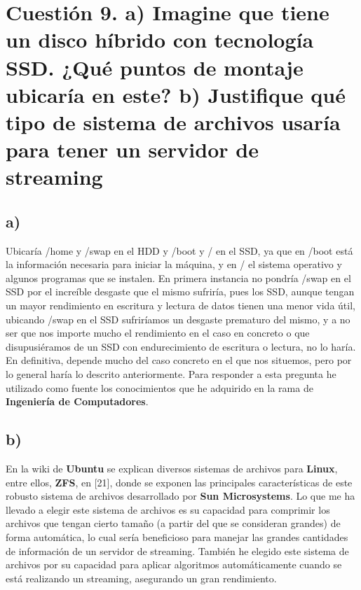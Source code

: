

\section{Cuestión 9. a) Imagine que tiene un disco híbrido con tecnología SSD. ¿Qué puntos de montaje ubicaría en este? b) Justifique qué tipo de sistema de archivos usaría para tener un servidor de streaming}

\subsection{a)}
Ubicaría /home y /swap en el HDD y /boot y / en el SSD, ya que en /boot está la información necesaria para iniciar la máquina, y en / el sistema operativo y algunos programas que se instalen.
En primera instancia no pondría /swap en el SSD por el increíble desgaste que el mismo sufriría, pues los SSD, aunque tengan un mayor rendimiento en escritura y lectura de datos tienen una menor vida útil, ubicando /swap en el SSD sufriríamos un desgaste prematuro del mismo, y a no ser que nos importe mucho el rendimiento en el caso en concreto o que disupusiéramos de un SSD con endurecimiento de escritura o lectura, no lo haría. En definitiva, depende mucho del caso concreto en el que nos situemos, pero por lo general haría lo descrito anteriormente.
Para responder a esta pregunta he utilizado como fuente los conocimientos que he adquirido en la rama de \textbf{Ingeniería de Computadores}.

\subsection{b)}
En la wiki de \textbf{Ubuntu} se explican diversos sistemas de archivos para \textbf{Linux}, entre ellos, \textbf{ZFS}, en [21], donde se exponen las principales características de este robusto sistema de archivos desarrollado por \textbf{Sun Microsystems}. Lo que me ha llevado a elegir este sistema de archivos es su capacidad para comprimir los archivos que tengan cierto tamaño (a partir del que se consideran grandes) de forma automática, lo cual sería beneficioso para manejar las grandes cantidades de información de un servidor de streaming.
También he elegido este sistema de archivos por su capacidad para aplicar algoritmos automáticamente cuando se está realizando un streaming, asegurando un gran rendimiento.

